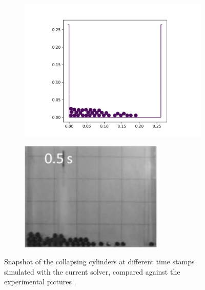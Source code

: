 \begin{figure}[!htpb]
  \begin{subfigure}{0.48\textwidth}
    \centering
    \includegraphics[width=1.0\textwidth]{figures/rfc/figures/stack_of_cylinders_2d/Mohseni_Vyas/time3}
  \end{subfigure}
  \begin{subfigure}{0.48\textwidth}
    \centering
    \includegraphics[width=0.75\textwidth]{images/rfc/images/stack_of_cylinders_experimental_images/time3}
  \end{subfigure}
  \caption{Snapshot of the collapsing cylinders at different time stamps
    simulated with the current solver, compared against the experimental
    pictures \citep{zhang_simulation_2009}.}
\label{fig:snapshots-stack-of-cylinders}
\end{figure}
%


